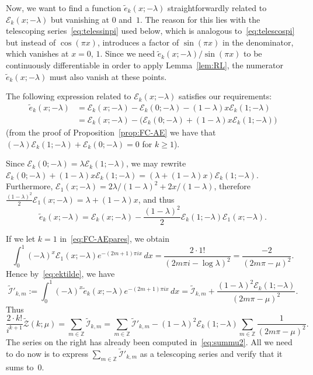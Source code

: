 \documentclass[11pt, oneside]{article}
\newcommand{\Z}{\mathbb{Z}}
\newcommand{\calE}{\mathcal{E}}
\newcommand{\calI}{\mathcal{I}}
\newcommand{\calZ}{\mathcal{Z}}
\theoremstyle{plain}
\theoremstyle{definition}
\begin{document}
Now, we want to find a function $\widetilde{e}_{k}(x;-\lambda)$ straightforwardly related to $\calE_{k}(x;-\lambda)$ but vanishing at $0$ and~$1$. The reason for this lies with the telescoping series~\eqref{eq:telessinpi} used below, which is analogous to~\eqref{eq:telescospi} but instead of $\cos(\pi x)$, introduces a factor of $\sin(\pi x)$ in the denominator, which vanishes at $x = 0$, $1$. Since we need  $\widetilde{e}_{k}(x;-\lambda)/\sin(\pi x)$ to be continuously differentiable in order
to apply Lemma~\ref{lem:RL}, the numerator $\widetilde{e}_{k}(x;-\lambda)$ must also vanish at these points.

The following expression related to $\calE_{k}(x;-\lambda)$ satisfies our requirements:
\begin{align*}
  \widetilde{e}_{k}(x;-\lambda) 
  &= \calE_{k}(x;-\lambda) - \calE_{k}(0;-\lambda) - (1-\lambda) x \calE_{k}(1;-\lambda) \\
  &= \calE_{k}(x;-\lambda) - \Big(\calE_{k}(0;-\lambda) + (1-\lambda) x \calE_{k}(1;-\lambda)\Big)
\end{align*}
(from the proof of Proposition~\ref{prop:FC-AE} we have that $(-\lambda)\calE_{k}(1;-\lambda) + \calE_{k}(0;-\lambda) = 0$ for $k \ge1$).

Since $\calE_{k}(0;-\lambda) = \lambda \calE_{k}(1;-\lambda)$, we may rewrite
$\calE_{k}(0;-\lambda) + (1-\lambda) x \calE_{k}(1;-\lambda) = (\lambda+(1-\lambda)x) \calE_{k}(1;-\lambda)$.
Furthermore, $\calE_{1}(x;-\lambda) = 2\lambda/(1-\lambda)^2 + 2x/(1-\lambda)$, therefore $\frac{(1-\lambda)^2}{2} \calE_{1}(x;-\lambda) = \lambda+(1-\lambda)x$, and thus
\begin{equation}
\label{eq:ektilde}
  \widetilde{e}_{k}(x;-\lambda) 
  = \calE_{k}(x;-\lambda)  - \frac{(1-\lambda)^2}{2} \calE_{k}(1;-\lambda) \calE_{1}(x;-\lambda).
\end{equation}

If we let $k=1$ in~\eqref{eq:FC-AEpares}, we obtain
\[
  \int_0^1 (-\lambda)^x \calE_{1}(x;-\lambda) e^{-(2m+1)\pi ix}\,dx
  = \frac{2 \cdot 1!}{(2m\pi i - \log \lambda)^{2}} = \frac{-2}{(2m\pi - \mu)^{2}}.
\]
Hence by~\eqref{eq:ektilde}, we have
\[
  \widetilde{\calI}'_{k,m} := \int_0^1 (-\lambda)^x \widetilde{e}_{k}(x;-\lambda) e^{-(2m+1)\pi ix} \,dx 
  = \widetilde{\calI}_{k,m} + \frac{(1-\lambda)^2\calE_{k}(1;-\lambda)}{(2m\pi-\mu)^2}.
\]
Thus
\[
  \frac{2\cdot k!}{i^{k+1}} \widetilde{\calZ}(k;\mu)
  = \sum_{m\in\Z} \widetilde{\calI}_{k,m}
  = \sum_{m\in\Z} \widetilde{\calI}'_{k,m} 
    - (1-\lambda)^2 \calE_{k}(1;-\lambda) \sum_{m\in\Z} \frac{1}{(2m\pi-\mu)^2}.
\]
The series on the right has already been computed in~\eqref{eq:summu2}.
All we need to do now is to express $\sum_{m\in\Z} \widetilde{\calI}'_{k,m}$ as a telescoping series and verify that it sums to~$0$. 
\end{document}
